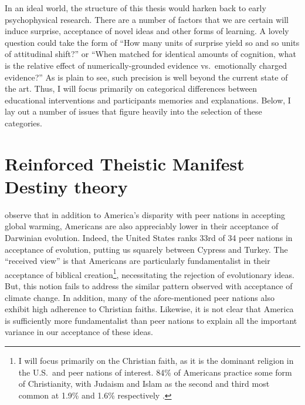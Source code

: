 In an ideal world, the structure of this thesis would harken back to early
psychophysical research. There are a number of factors that we are certain will
induce surprise, acceptance of novel ideas and other forms of learning. A
lovely question could take the form of ``How many units of surprise yield so and
so units of attitudinal shift?'' or ``When matched for identical amounts of
cognition, what is the relative effect of numerically-grounded evidence vs.\
emotionally charged evidence?'' As is plain to see, such precision is well
beyond the current state of the art. Thus, I will focus primarily on categorical
differences between educational interventions and participants memories and
explanations. Below, I lay out a number of issues that figure heavily into the
selection of these categories.

\section{Reinforced Theistic Manifest Destiny theory}


\citeauthor{ranney_why_inpress} observe that in addition to America's disparity
with peer nations in accepting global warming, Americans are also appreciably
lower in their acceptance of Darwinian evolution. Indeed, the United States
ranks 33rd of 34 peer nations in acceptance of evolution, putting us
squarely between Cypress and Turkey. The ``received view'' is that Americans are
particularly fundamentalist in their acceptance of biblical creation\footnote{I
will focus primarily on the Christian faith, as it is the dominant religion in
the U.S.\ and peer nations of interest. 84\% of Americans practice some form of
Christianity, with Judaism and Islam as the second and third most common at
1.9\% and 1.6\% respectively \cite{wolfram_alpha_faith}.}, 
necessitating the rejection of evolutionary ideas. But, this notion fails to
address the similar pattern observed with acceptance of climate change. In
addition, many of the afore-mentioned peer nations also exhibit high adherence
to Christian faiths.  Likewise, it is not clear that America is sufficiently
more fundamentalist than peer nations to explain all the important variance in
our acceptance of these ideas. 

